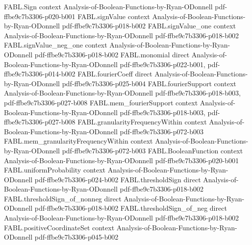 \begin{theorem}
\label{FABL.booleanInfluence_neg_dictator}
\leanok
{}
\proofstep
  {FABL.Sign}
  {context}
  {Analysis-of-Boolean-Functions-by-Ryan-ODonnell}
  {pdf-ffbe9c7b3306-p020-b001}
\proofstep
  {FABL.signValue}
  {context}
  {Analysis-of-Boolean-Functions-by-Ryan-ODonnell}
  {pdf-ffbe9c7b3306-p018-b002}
\proofstep
  {FABL.signValue_one}
  {context}
  {Analysis-of-Boolean-Functions-by-Ryan-ODonnell}
  {pdf-ffbe9c7b3306-p018-b002}
\proofstep
  {FABL.signValue_neg_one}
  {context}
  {Analysis-of-Boolean-Functions-by-Ryan-ODonnell}
  {pdf-ffbe9c7b3306-p018-b002}
\proofstep
  {FABL.monomial}
  {direct}
  {Analysis-of-Boolean-Functions-by-Ryan-ODonnell}
  {pdf-ffbe9c7b3306-p022-b001,
    pdf-ffbe9c7b3306-p014-b002}
\proofstep
  {FABL.fourierCoeff}
  {direct}
  {Analysis-of-Boolean-Functions-by-Ryan-ODonnell}
  {pdf-ffbe9c7b3306-p025-b004}
\proofstep
  {FABL.fourierSupport}
  {context}
  {Analysis-of-Boolean-Functions-by-Ryan-ODonnell}
  {pdf-ffbe9c7b3306-p018-b003,
    pdf-ffbe9c7b3306-p027-b008}
\proofstep
  {FABL.mem_fourierSupport}
  {context}
  {Analysis-of-Boolean-Functions-by-Ryan-ODonnell}
  {pdf-ffbe9c7b3306-p018-b003,
    pdf-ffbe9c7b3306-p027-b008}
\proofstep
  {FABL.granularityFrequencyWithin}
  {context}
  {Analysis-of-Boolean-Functions-by-Ryan-ODonnell}
  {pdf-ffbe9c7b3306-p072-b003}
\proofstep
  {FABL.mem_granularityFrequencyWithin}
  {context}
  {Analysis-of-Boolean-Functions-by-Ryan-ODonnell}
  {pdf-ffbe9c7b3306-p072-b003}
\proofstep
  {FABL.BooleanFunction}
  {context}
  {Analysis-of-Boolean-Functions-by-Ryan-ODonnell}
  {pdf-ffbe9c7b3306-p020-b001}
\proofstep
  {FABL.uniformProbability}
  {context}
  {Analysis-of-Boolean-Functions-by-Ryan-ODonnell}
  {pdf-ffbe9c7b3306-p024-b002}
\proofstep
  {FABL.thresholdSign}
  {direct}
  {Analysis-of-Boolean-Functions-by-Ryan-ODonnell}
  {pdf-ffbe9c7b3306-p018-b002}
\proofstep
  {FABL.thresholdSign_of_nonneg}
  {direct}
  {Analysis-of-Boolean-Functions-by-Ryan-ODonnell}
  {pdf-ffbe9c7b3306-p018-b002}
\proofstep
  {FABL.thresholdSign_of_neg}
  {direct}
  {Analysis-of-Boolean-Functions-by-Ryan-ODonnell}
  {pdf-ffbe9c7b3306-p018-b002}
\proofstep
  {FABL.positiveCoordinateSet}
  {context}
  {Analysis-of-Boolean-Functions-by-Ryan-ODonnell}
  {pdf-ffbe9c7b3306-p045-b002}

\end{theorem}
